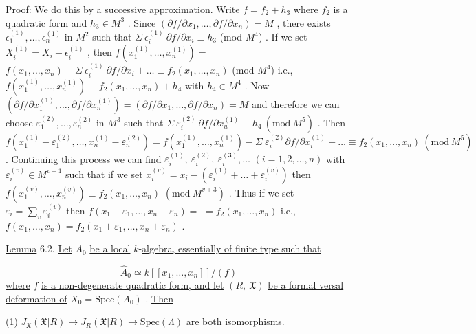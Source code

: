 \underline{Proof}:  We do this by a successive approximation. Write  $f = f_2 + h_3$  where  $f_2$ is a quadratic form and  $h_3 \in M^3$  . Since  $(\partial f/\partial x_1,\ldots,\partial f/\partial x_n) = M$  , there exists $\epsilon_1^{(1)},\ldots,\epsilon_n^{(1)}$  in  $M^2$  such that  $\Sigma\ \epsilon_i^{(1)}\ \partial f/\partial x_i \equiv h_3$  (mod $M^4$)  . If we set $X_i^{(1)} = X_i - \epsilon_i^{(1)}$  , then  $f(x_1^{(1)},\ldots,x_n^{(1)}) =$ $f(x_1,\ldots,x_n) - \Sigma\ \epsilon_i^{(1)}\ \partial f/\partial x_i + \ldots \equiv f_2(x_1,\ldots,x_n)$  (mod $M^4$)  i.e., $f(x_1^{(1)},\ldots,x_n^{(1)}) \equiv f_2(x_1,\ldots,x_n) + h_4$  with  $h_4 \in M^4$  . Now $(\partial f/\partial x_1^{(1)},\ldots,\partial f/\partial x_n^{(1)}) = (\partial f/\partial x_1,\ldots,\partial f/\partial x_n) = M$  and therefore we can choose
$\varepsilon_1^{(2)},\dots,\varepsilon_n^{(2)}$  in  $M^3$  such that  $\Sigma\ \varepsilon_i^{(2)}\ \partial f/\partial x_u^{(1)} \equiv h_4\ (\mathrm{mod}\ M^5)$ . Then $f(x_1^{(1)} - \varepsilon_1^{(2)},\dots,x_n^{(1)} - \varepsilon_n^{(2)}) = f(x_1^{(1)},\dots,x_n^{(1)}) - \Sigma\ \varepsilon_i^{(2)}\partial f/\partial x_i^{(1)} + \dots \equiv f_2(x_1,\dots,x_n)\ (\mathrm{mod}\ M^5)$ . Continuing this process we can find $\varepsilon_i^{(1)},\ \varepsilon_i^{(2)},\ \varepsilon_i^{(3)},\dots$  $(i = 1,2,\dots,n)$  with  $\varepsilon_i^{(v)} \in M^{v+1}$  such that if we set $x_i^{(v)} = x_i - (\varepsilon_i^{(1)} + \dots + \varepsilon_i^{(v)})$  then  $f(x_1^{(v)},\dots,x_n^{(v)}) \equiv f_2(x_1,\dots,x_n)$ $(\mathrm{mod}\ M^{v+3})$ . Thus if we set  $\varepsilon_i = \sum_{v} \varepsilon_i^{(v)}$  then  $f(x_1-\varepsilon_1,\dots,x_n-\varepsilon_n) =$ $= f_2(x_1,\dots,x_n)$  i.e.,  $f(x_1,\dots,x_n) = f_2(x_1+\varepsilon_1,\dots,x_n+\varepsilon_n)$ .

\underline{Lemma} 6.2.   \underline{Let}  $A_0$  \underline{be a local} $k$-\underline{algebra, essentially of finite type such that}

\begin{equation*}
\hat{A}_0 \simeq k[[x_1,\dots,x_n]]/(f)
\end{equation*}
\underline{where}  $f$  \underline{is a non-degenerate quadratic form, and let}  $(R,\ \mathfrak{X})$  \underline{be a formal versal deformation of}  $X_0 = \mathrm{Spec}(A_0)$  . \underline{Then}

(1)  $J_{\mathfrak{X}}(\mathfrak{X}|R) \rightarrow J_R(\mathfrak{X}|R) \rightarrow \mathrm{Spec}(\Lambda)$  \underline{are both isomorphisms.}


